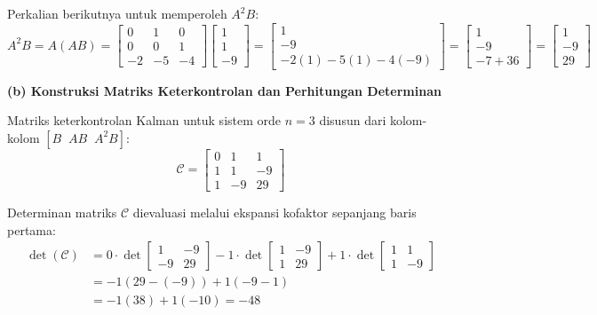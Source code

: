 \documentclass[11pt,a4paper]{article}
\begin{document}
Perkalian berikutnya untuk memperoleh $A^2 B$:
$$A^2 B = A(AB) = \begin{bmatrix} 0 & 1 & 0 \\ 0 & 0 & 1 \\ -2 & -5 & -4 \end{bmatrix} \begin{bmatrix} 1 \\ 1 \\ -9 \end{bmatrix} = \begin{bmatrix} 1 \\ -9 \\ -2(1) - 5(1) - 4(-9) \end{bmatrix} = \begin{bmatrix} 1 \\ -9 \\ -7 + 36 \end{bmatrix} = \begin{bmatrix} 1 \\ -9 \\ 29 \end{bmatrix}$$

\textbf{(b) Konstruksi Matriks Keterkontrolan dan Perhitungan Determinan}

Matriks keterkontrolan Kalman untuk sistem orde $n = 3$ disusun dari kolom-kolom $[B \;\; AB \;\; A^2 B]$:
$$\mathcal{C} = \begin{bmatrix} 0 & 1 & 1 \\ 1 & 1 & -9 \\ 1 & -9 & 29 \end{bmatrix}$$

Determinan matriks $\mathcal{C}$ dievaluasi melalui ekspansi kofaktor sepanjang baris pertama:
\begin{align*}
    \det(\mathcal{C}) &= 0 \cdot \det\begin{bmatrix} 1 & -9 \\ -9 & 29 \end{bmatrix} - 1 \cdot \det\begin{bmatrix} 1 & -9 \\ 1 & 29 \end{bmatrix} + 1 \cdot \det\begin{bmatrix} 1 & 1 \\ 1 & -9 \end{bmatrix} \\
    &= -1(29 - (-9)) + 1(-9 - 1) \\
    &= -1(38) + 1(-10) = -48
\end{align*}
\end{document}
